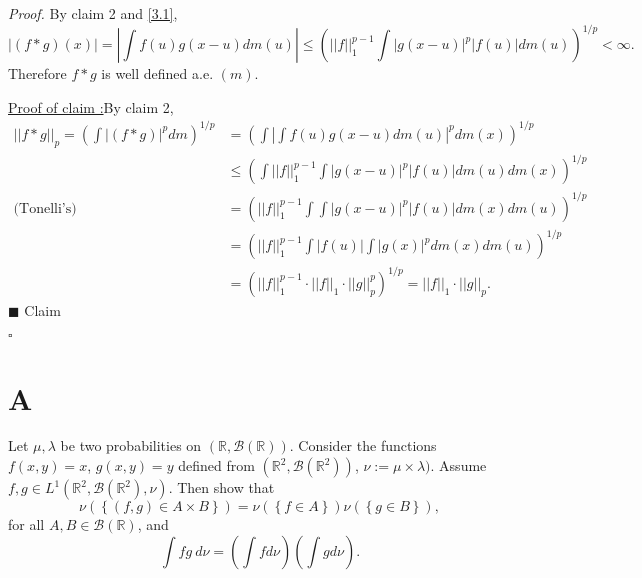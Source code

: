 \documentclass[12pt]{article}
\newcounter{ProofCounter}
\newcounter{ClaimCounter}[ProofCounter]
\newenvironment{Proof}{\stepcounter{ProofCounter}\textit{Proof.}}{\hfill$\square$}
\newenvironment{claim}[1]{\vspace{3mm}\stepcounter{ClaimCounter}\par\noindent\underline{\bf Claim \theClaimCounter:}\space#1}{}
\newenvironment{claimproof}[1]{\par\noindent\underline{Proof of claim \theClaimCounter:}\space#1}{\hfill $\blacksquare$ Claim \theClaimCounter}
\begin{document}
\begin{Proof}
By claim 2 and \eqref{3.1},
\[ |(f*g)(x)| = \left| \int f(u)g(x-u)dm(u)\right| \leq \left( ||f||_{1}^{p-1}\int |g(x-u)|^{p}|f(u)|dm(u) \right)^{1/p} < \infty. \]
Therefore $f*g$ is well defined a.e. $(m)$.

\begin{claimproof}
By claim 2,
\begin{align*}
||f*g||_{p} = \left( \int |(f*g)|^{p}dm \right)^{1/p} & = \left( \int \left| \int f(u)g(x-u)dm(u)\right|^{p}dm(x) \right)^{1/p} \\
& \leq \left( \int ||f||_{1}^{p-1}\int |g(x-u)|^{p}|f(u)|dm(u)dm(x) \right)^{1/p} \\
\text{(Tonelli's) } & = \left( ||f||_{1}^{p-1}\int\int |g(x-u)|^{p}|f(u)|dm(x)dm(u) \right)^{1/p} \\
& = \left( ||f||_{1}^{p-1}\int |f(u)|\int |g(x)|^{p}dm(x)dm(u) \right)^{1/p} \\
& = \left( ||f||_{1}^{p-1}\cdot ||f||_{1}\cdot ||g||_{p}^{p} \right)^{1/p} = ||f||_{1}\cdot ||g||_{p}.
\end{align*}
\end{claimproof}

\end{Proof}











\newpage 
\section*{A}
Let $\mu, \lambda$ be two probabilities on $(\mathbb{R}, \mathcal{B}(\mathbb{R}))$. Consider the functions $f(x,y) = x$, $g(x,y) = y$ defined from
$(\mathbb{R}^{2}, \mathcal{B}(\mathbb{R}^{2}))$, $\nu := \mu \times \lambda)$. Assume $f,g \in L^{1}(\mathbb{R}^{2}, \mathcal{B}(\mathbb{R}^{2}),
\nu)$. Then show that 
\[ \nu\left( \left\{ (f,g) \in A\times B \right\} \right) = \nu\left( \left\{ f\in A \right\} \right)\nu\left( \left\{ g \in B \right\} \right), \]
for all $A,B \in \mathcal{B}(\mathbb{R})$, and 
\[ \int fg\  d\nu = \left( \int fd\nu \right)\left( \int gd\nu \right). \]
\end{document}
